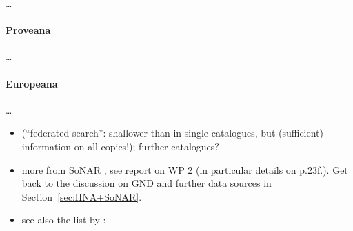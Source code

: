 \dots

\paragraph{Proveana}

\dots

\paragraph{Europeana}

\dots

\par\bigskip
{}

\begin{itemize}
  \item
     (\enquote{federated search}: shallower than in single catalogues,
    but (sufficient) information on all copies!);
    further catalogues?
  \item
    more from \gls{SoNAR} , see report on WP 2 (in particular details on p.23f.).
    Get back to the discussion on \gls{GND} and further data sources in Section~\ref{sec:HNA+SoNAR}.
  \item
    see also the list by \autocite{Menzel2020}:


\end{itemize}
